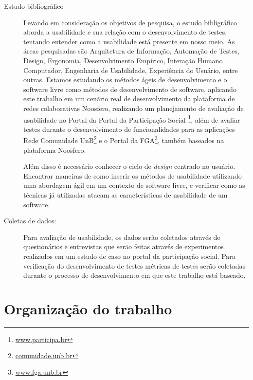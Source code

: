 \begin{description}
\item[Estudo bibliográfico]
%

Levando em consideração os objetivos de pesquisa, o estudo bibligráfico  aborda a usabilidade e sua relação com o desenvolvimento de testes, tentando entender como a usabilidade está presente em nosso meio. As áreas pesquisadas são Arquitetura de Informação, Automação de Testes, Design, Ergonomia, Desenvolvimento Empírico, Interação Humano Computador, Engenharia de Usabilidade, Experiência do Usuário, entre outras.
%
Estamos estudando os métodos ágeis de desenvolvimento e o software livre como métodos de desenvolvimento de software, aplicando este trabalho em um cenário real de desenvolvimento da plataforma de redes colaborativas Noosfero, realizando um planejamento de avaliação de usabilidade no Portal da Portal da Participação Social \footnote{\url{www.participa.br}}, além de avaliar testes durante o desenvolvimento de funcionalidades para as aplicações Rede Comunidade UnB\footnote{\url{comunidade.unb.br}} e o Portal da FGA\footnote{\url{www.fga.unb.br}}, também baseados na plataforma Noosfero.

%
Além disso é necessário conhecer o ciclo de \emph{design} centrado no usuário. Encontrar maneiras de como inserir os métodos de usabilidade utilizando uma abordagem ágil em um contexto de software livre, e verificar como as técnicas já utilizadas atacam as características de usabilidade de um software.

\item[Coletas de dados:]
%
Para avaliação de usabilidade, os dados serão coletados através de questionários e entrevistas que serão feitas através de experimentos realizados em um estudo de caso no portal da participação social.
Para verificação do desenvolvimento de testes métricas de testes serão coletadas durante o processo de desenvolvimento em que este trabalho está baseado.

\end{description}

\section{Organização do trabalho}

